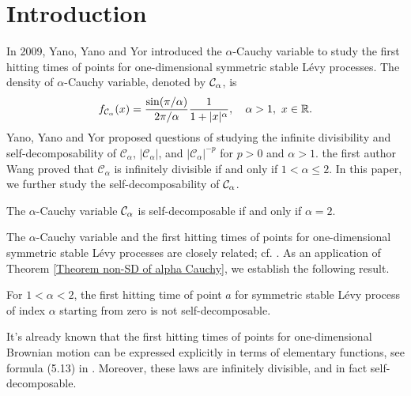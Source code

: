 \documentclass[12pt]{amsart}
\begin{document}
\section{Introduction}
In 2009, Yano, Yano and Yor \cite{YYY09} introduced the $\alpha$-Cauchy variable to study the first hitting times of points for one-dimensional symmetric stable L\'evy processes.  
The density of $\alpha$-Cauchy variable, denoted by $\mathcal{C}_\alpha$, is 
\begin{equation}\label{eq density alpha Cauchy}
    f_{\mathcal{C}_\alpha}(x) = \frac{\sin(\pi/\alpha)}{2\pi/\alpha}\frac{1}{1+|x|^\alpha}, \quad \alpha > 1, \,\, x \in \mathbb{R}. 
\end{equation}
Yano, Yano and Yor \cite[Remark 2.9]{YYY09} proposed questions of studying the infinite divisibility and self-decomposability of  $\mathcal{C}_\alpha$, $|\mathcal{C}_\alpha|$, and $|\mathcal{C}_\alpha|^{-p}$ for $ p>0$ and $\alpha > 1$. 
the first author Wang \cite{Wan26+} proved that $\mathcal{C}_\alpha$ is infinitely divisible if and only if $1 < \alpha \leq 2$. 
In this paper, we further study the self-decomposability of $\mathcal{C}_\alpha$. 

\begin{theorem}\label{Theorem non-SD of alpha Cauchy}
The $\alpha$-Cauchy variable $\mathcal{C}_\alpha$ is self-decomposable if and only if  $\alpha = 2$. 
\end{theorem}


The  $\alpha$-Cauchy variable and the first hitting times of points for one-dimensional symmetric stable L\'evy processes are closely related; cf. \cite{YYY09, LS14, LS19, Wan26+}. As an application of Theorem \ref{Theorem non-SD of alpha Cauchy}, we establish the following result. 


\begin{corollary}\label{Corollary}
    For $1<\alpha <2$, the first hitting time of point $a$ for symmetric stable L\'evy process of index $\alpha$ starting from zero is not self-decomposable. 
\end{corollary}

It’s already known that the first hitting times of points for one-dimensional Brownian motion can be expressed explicitly in terms of elementary functions, see formula (5.13) in \cite{YYY09}. Moreover, these laws are infinitely divisible, and in fact self-decomposable. 

\end{document}
